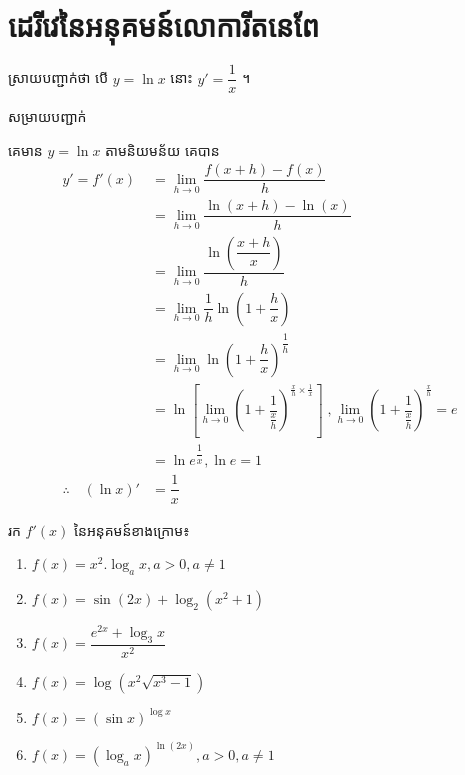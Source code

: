 \documentclass[12pt,fleqn]{book} %
\newcommand{\solution}{{\begin{center}\kml \color{blue} សម្រាយបញ្ជាក់\end{center} }}
\begin{document}
\section{ដេរីវេនៃអនុគមន៍លោការីតនេពែ}
ស្រាយបញ្ជាក់ថា បើ $y=\ln x$ នោះ $y'=\dfrac{1}{x}$ ។
\solution 
គេមាន $y=\ln x$ តាមនិយមន័យ គេបាន
\begin{align*}
y'=f'(x)&=\lim_{h\to 0}\dfrac{f(x+h)-f(x)}{h}\\
&=\lim_{h\to 0}\dfrac{\ln (x+h)-\ln (x)}{h}\\
&=\lim_{h\to 0}\dfrac{\ln \left(\dfrac{x+h}{x} \right)}{h}\\
&=\lim_{h\to 0}\dfrac{1}{h}\ln \left(1+\dfrac{h}{x} \right)\\
&=\lim_{h\to 0}\ln \left(1+\dfrac{h}{x}\right)^{\dfrac{1}{h}}\\
&=\ln \left[\lim_{h\to 0}\left(1+\dfrac{1}{\frac{x}{h}} \right)^{\frac{x}{h}\times \frac{1}{x}}  \right]\;, \lim_{h\to 0}\left(1+\dfrac{1}{\frac{x}{h}} \right)^{\frac{x}{h}}=e\\
&=\ln e^{\dfrac{1}{x}},\ln e=1\\
\therefore \quad (\ln x)'&=\dfrac{1}{x} 
\end{align*}
\begin{example}
រក $f'(x)$ នៃអនុគមន៍ខាងក្រោម៖
\begin{multicols}{2}
\begin{enumerate}
\item $f(x)=x^2.\log_a x, a>0,a\neq 1$
\item $f(x)=\sin (2x)+\log_2 (x^2+1)$
\item $f(x)=\dfrac{e^{2x}+\log_3 x}{x^2}$
\item $f(x)=\log (x^2 \sqrt{x^3-1})$
\item $f(x)=(\sin x)^{\log x}$
\item $f(x)=(\log _a x)^{\ln (2x)},a>0,a\neq 1$
\end{enumerate}
\end{multicols}
\end{example}
\end{document}
